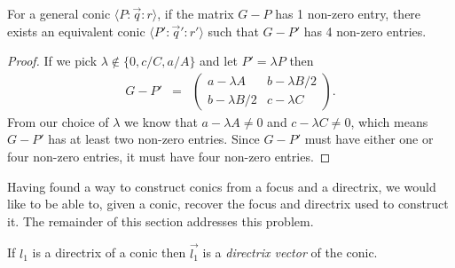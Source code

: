 \begin{lemma}
For a general conic $\langle P\!:\!\vec{q}\!:\!r \rangle$, if the matrix $G - P$ has 1 non-zero entry, there exists an equivalent conic $\langle P'\!:\!\vec{q}'\!:\!r' \rangle$ such that $G - P'$ has 4 non-zero entries.
\end{lemma}
\begin{proof}
If we pick $\lambda \notin \{0, c/C, a/A\}$ and let $P' = \lambda P$ then
\begin{eqnarray*}
G - P' & = & \left(\begin{array}{cc} a - \lambda A & b - \lambda B/2 \\ b - \lambda B/2 & c - \lambda C \end{array}\right).
\end{eqnarray*}
From our choice of $\lambda$ we know that $a - \lambda A \neq 0$ and $c - \lambda C \neq 0$, which means $G - P'$ has at least two non-zero entries. Since $G-P'$ must have either one or four non-zero entries, it must have four non-zero entries.
\end{proof}

Having found a way to construct conics from a focus and a directrix, we would like to be able to, given a conic, recover the focus and directrix used to construct it.
The remainder of this section addresses this problem.

\begin{definition}If $l_1$ is a directrix of a conic then $\vec{l_1}$ is a \emph{directrix vector} of the conic.
\end{definition}

